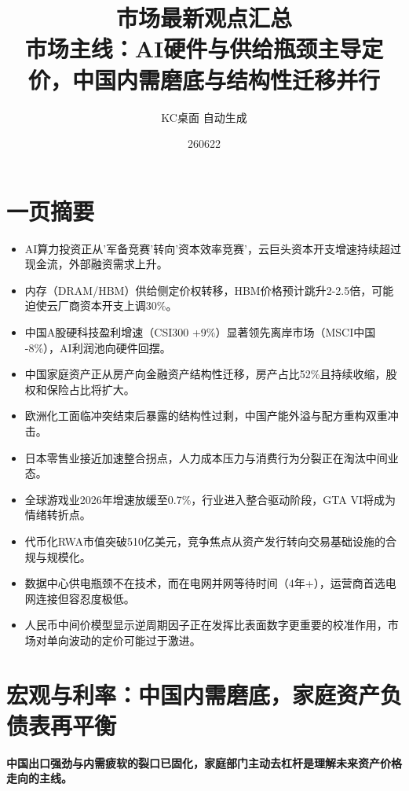 \documentclass[11pt]{ctexart}
\title{\textbf{市场最新观点汇总}\\[0.4em]{\large 市场主线：AI硬件与供给瓶颈主导定价，中国内需磨底与结构性迁移并行}}
\author{KC桌面 自动生成}
\date{260622}
\begin{document}
\maketitle
\tableofcontents
\newpage
\section{一页摘要}
\begin{itemize}
  \item AI算力投资正从'军备竞赛'转向'资本效率竞赛'，云巨头资本开支增速持续超过现金流，外部融资需求上升。
  \item 内存（DRAM/HBM）供给侧定价权转移，HBM价格预计跳升2-2.5倍，可能迫使云厂商资本开支上调30\%。
  \item 中国A股硬科技盈利增速（CSI300 +9\%）显著领先离岸市场（MSCI中国 -8\%），AI利润池向硬件回摆。
  \item 中国家庭资产正从房产向金融资产结构性迁移，房产占比52\%且持续收缩，股权和保险占比将扩大。
  \item 欧洲化工面临冲突结束后暴露的结构性过剩，中国产能外溢与配方重构双重冲击。
  \item 日本零售业接近加速整合拐点，人力成本压力与消费行为分裂正在淘汰中间业态。
  \item 全球游戏业2026年增速放缓至0.7\%，行业进入整合驱动阶段，GTA VI将成为情绪转折点。
  \item 代币化RWA市值突破510亿美元，竞争焦点从资产发行转向交易基础设施的合规与规模化。
  \item 数据中心供电瓶颈不在技术，而在电网并网等待时间（4年+），运营商首选电网连接但容忍度极低。
  \item 人民币中间价模型显示逆周期因子正在发挥比表面数字更重要的校准作用，市场对单向波动的定价可能过于激进。
\end{itemize}
\section{宏观与利率：中国内需磨底，家庭资产负债表再平衡}
\textbf{中国出口强劲与内需疲软的裂口已固化，家庭部门主动去杠杆是理解未来资产价格走向的主线。}
\end{document}
